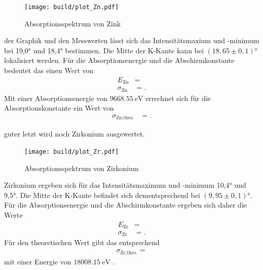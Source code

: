 \begin{figure}[H]
    \centering
    \texttt{[image: build/plot\_Zn.pdf]}
    \caption{Absorptionsspektrum von Zink\cite{matplotlib}}
    \label{fig:8}
\end{figure}

\justifying der Graphik und den Messwerten lässt sich das Intensitätsmaxium und 
-minimum bei 19,0° und 18,4° bestimmen.
Die Mitte der K-Kante kann bei $(18,65\pm 0,1)° $ lokalisiert werden.
Für die Absorptionsenergie und die Abschirmkonstante bedeutet das einen Wert von
\begin{align}
    E_{\text{Zn}} &= \text{} \label{eq:39}\\
    \sigma _{\text{Zn}} &= \text{} \label{eq:40}.
\end{align}
Mit einer Absorptionsenergie von $\SI{9668.55}{\electronvolt} $ \cite{NIST} errechnet
sich für die Absorptionskonstante ein Wert von
\begin{align}
    \sigma _{\text{Zn,theo.}}&= \text{} \label{eq:41}.
\end{align}


\justifying guter letzt wird noch Zirkonium ausgewertet.


\begin{figure}[H]
    \centering
    \texttt{[image: build/plot\_Zr.pdf]}
    \caption{Absorptionsspektrum von Zirkonium\cite{matplotlib}}
    \label{fig:9}
\end{figure}
\justifying Zirkonium ergeben sich für das Intensitätsmaximum und -minimum
10,4° und 9,5°.
Die Mitte der K-Kante befindet sich dementsprechend bei $(9,95\pm 0,1)°$.
Für die Absorptionsenergie und die Abschirmkonstante ergeben sich daher
die Werte
\begin{align}
    E_{\text{Zr}} &= \text{} \label{eq:42} \\
    \sigma _{\text{Zr}} &= \text{} \label{eq:43}.
\end{align}
Für den theoretischen Wert gibt das entsprechend
\begin{align}
    \sigma _{\text{Zr,theo.}} = \text{} \label{eq:44}
\end{align}
mit einer Energie von $\SI{18008.15}{\electronvolt} $ \cite{NIST}.


